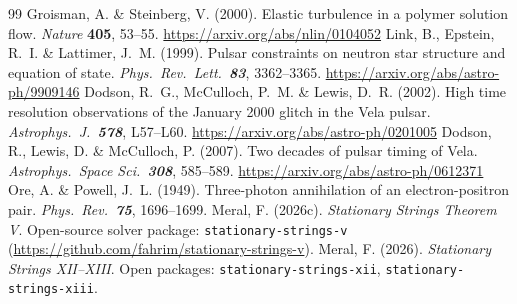 \documentclass[12pt,a4paper]{article}
\begin{document}
\begin{thebibliography}{99}
     Groisman, A. \& Steinberg, V. (2000). Elastic turbulence in
    a polymer solution flow. \textit{Nature} \textbf{405}, 53--55.
    \url{https://arxiv.org/abs/nlin/0104052}
     Link, B., Epstein, R.~I. \& Lattimer, J.~M. (1999).
    Pulsar constraints on neutron star structure and equation of state.
    \textit{Phys.\ Rev.\ Lett.\ \textbf{83}}, 3362--3365.
    \url{https://arxiv.org/abs/astro-ph/9909146}
     Dodson, R.~G., McCulloch, P.~M. \& Lewis, D.~R. (2002).
    High time resolution observations of the January 2000 glitch in the Vela
    pulsar. \textit{Astrophys.\ J.\ \textbf{578}}, L57--L60.
    \url{https://arxiv.org/abs/astro-ph/0201005}
     Dodson, R., Lewis, D. \& McCulloch, P. (2007). Two decades
    of pulsar timing of Vela. \textit{Astrophys.\ Space Sci.\ \textbf{308}}, 585--589.
    \url{https://arxiv.org/abs/astro-ph/0612371}
     Ore, A. \& Powell, J.~L. (1949). Three-photon annihilation
    of an electron-positron pair. \textit{Phys.\ Rev.\ \textbf{75}}, 1696--1699.
     Meral, F. (2026c). \textit{Stationary Strings Theorem V}.
    Open-source solver package: \texttt{stationary-strings-v}
    (\url{https://github.com/fahrim/stationary-strings-v}).
     Meral, F. (2026). \textit{Stationary Strings XII--XIII}.
    Open packages: \texttt{stationary-strings-xii}, \texttt{stationary-strings-xiii}.
\end{thebibliography}
\end{document}
